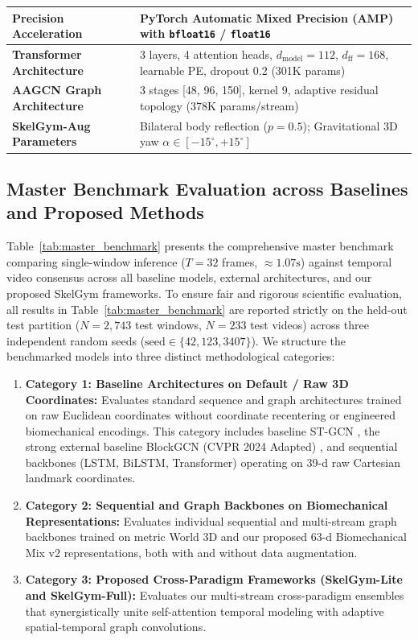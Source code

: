 \documentclass[preprint,12pt]{elsarticle}
\begin{document}
\begin{table}[!t]
{\begin{tabular}{l l}
\textbf{Precision Acceleration}    & PyTorch Automatic Mixed Precision (AMP) with \texttt{bfloat16} / \texttt{float16} \\
\midrule
\textbf{Transformer Architecture}  & 3 layers, 4 attention heads, $d_{\text{model}} = 112$, $d_{\text{ff}} = 168$, learnable PE, dropout 0.2 (301K params) \\
\textbf{AAGCN Graph Architecture}  & 3 stages [48, 96, 150], kernel 9, adaptive residual topology (378K params/stream) \\
\textbf{SkelGym-Aug Parameters}    & Bilateral body reflection ($p=0.5$); Gravitational 3D yaw $\alpha \in [-15^\circ, +15^\circ]$ \\
\bottomrule
\end{tabular}
}
\end{table}

\subsection{Master Benchmark Evaluation across Baselines and Proposed Methods}
\label{sec:master_benchmark}

Table~\ref{tab:master_benchmark} presents the comprehensive master benchmark comparing single-window inference ($T=32$ frames, $\approx 1.07\text{s}$) against temporal video consensus across all baseline models, external architectures, and our proposed SkelGym frameworks. To ensure fair and rigorous scientific evaluation, all results in Table~\ref{tab:master_benchmark} are reported strictly on the held-out test partition ($N=2,743$ test windows, $N=233$ test videos) across three independent random seeds ($\text{seed} \in \{42, 123, 3407\}$). We structure the benchmarked models into three distinct methodological categories:
\begin{enumerate}
    \item \textbf{Category 1: Baseline Architectures on Default / Raw 3D Coordinates:} Evaluates standard sequence and graph architectures trained on raw Euclidean coordinates without coordinate recentering or engineered biomechanical encodings. This category includes baseline ST-GCN \cite{yan2018}, the strong external baseline BlockGCN (CVPR 2024 Adapted) \cite{blockgcn2024}, and sequential backbones (LSTM, BiLSTM, Transformer) operating on 39-d raw Cartesian landmark coordinates.
    \item \textbf{Category 2: Sequential and Graph Backbones on Biomechanical Representations:} Evaluates individual sequential and multi-stream graph backbones trained on metric World 3D and our proposed 63-d Biomechanical Mix v2 representations, both with and without data augmentation.
    \item \textbf{Category 3: Proposed Cross-Paradigm Frameworks (SkelGym-Lite and SkelGym-Full):} Evaluates our multi-stream cross-paradigm ensembles that synergistically unite self-attention temporal modeling with adaptive spatial-temporal graph convolutions.
\end{enumerate}
\end{document}

